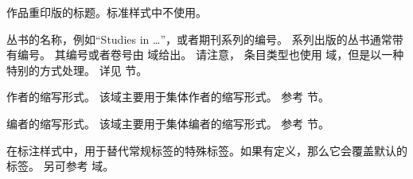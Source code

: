 \begin{fieldlist}

作品重印版的标题。标准样式中不使用。




丛书的名称，例如“Studies in \dots”，或者期刊系列的编号。
系列出版的丛书通常带有编号。
其编号或者卷号由  域给出。
请注意， 条目类型也使用  域，但是以一种特别的方式处理。
详见  节。




作者的缩写形式。
该域主要用于集体作者的缩写形式。
参考  节。




编者的缩写形式。
该域主要用于集体编者的缩写形式。
参考  节。




在标注样式中，用于替代常规标签的特殊标签。如果有定义，那么它会覆盖默认的标签。
另可参考  域。




\end{fieldlist}
